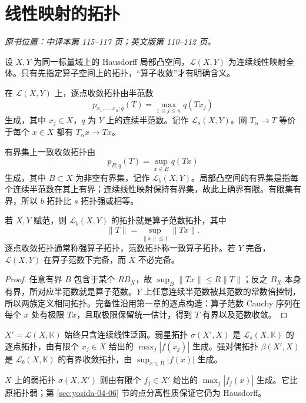 \section{线性映射的拓扑}\label{sec:yosida-04-07}
\noindent\textit{原书位置：中译本第 115--117 页；英文版第 110--112 页。}

设 $X,Y$ 为同一标量域上的 Hausdorff 局部凸空间，$\mathcal L(X,Y)$ 为连续线性映射全体。只有先指定算子空间上的拓扑，“算子收敛”才有明确含义。

\begin{definition}[逐点收敛与有界集上一致收敛]\label{def:y4-operator-topologies}
在 $\mathcal L(X,Y)$ 上，逐点收敛拓扑由半范数
\[
 p_{x_1,\ldots,x_n;q}(T)=\max_{1\le j\le n}q(Tx_j)
\]
生成，其中 $x_j\in X$，$q$ 为 $Y$ 上的连续半范数。记作 $\mathcal L_s(X,Y)$。网 $T_\alpha\to T$ 等价于每个 $x\in X$ 都有 $T_\alpha x\to Tx$。

有界集上一致收敛拓扑由
\[
 p_{B;q}(T)=\sup_{x\in B}q(Tx)
\]
生成，其中 $B\subset X$ 为非空有界集，记作 $\mathcal L_b(X,Y)$。局部凸空间的有界集是指每个连续半范数在其上有界；连续线性映射保持有界集，故此上确界有限。有限集有界，所以 $b$ 拓扑比 $s$ 拓扑强或相等。
\end{definition}

\begin{proposition}[赋范空间中的算子拓扑]\label{prop:y4-operator-norm-topology}
若 $X,Y$ 赋范，则 $\mathcal L_b(X,Y)$ 的拓扑就是算子范数拓扑，其中
\[
 \|T\|=\sup_{\|x\|\le1}\|Tx\|.
\]
逐点收敛拓扑通常称强算子拓扑，范数拓扑称一致算子拓扑。若 $Y$ 完备，$\mathcal L(X,Y)$ 在算子范数下完备，而 $X$ 不必完备。
\end{proposition}
\begin{proof}
任意有界 $B$ 包含于某个 $RB_X$，故 $\sup_B\|Tx\|\le R\|T\|$；反之 $B_X$ 本身有界，所对应半范数就是算子范数。$Y$ 上任意连续半范数被其范数的常数倍控制，所以两族定义相同拓扑。完备性沿用第一章的逐点构造：算子范数 Cauchy 序列在每个 $x$ 处有极限 $Tx$，且取极限保留统一估计，得到 $T$ 有界以及范数收敛。
\end{proof}

\begin{definition}[弱、弱星与强对偶拓扑]\label{def:y4-dual-topologies}
$X'=\mathcal L(X,\mathbb K)$ 始终只含连续线性泛函。弱星拓扑 $\sigma(X',X)$ 是 $\mathcal L_s(X,\mathbb K)$ 的逐点拓扑，由有限个 $x_j\in X$ 给出的 $\max_j|f(x_j)|$ 生成。强对偶拓扑 $\beta(X',X)$ 是 $\mathcal L_b(X,\mathbb K)$ 的有界收敛拓扑，由 $\sup_{x\in B}|f(x)|$ 生成。

$X$ 上的弱拓扑 $\sigma(X,X')$ 则由有限个 $f_j\in X'$ 给出的 $\max_j|f_j(x)|$ 生成。它比原拓扑弱；第 \ref{sec:yosida-04-06} 节的点分离性质保证它仍为 Hausdorff。
\end{definition}

